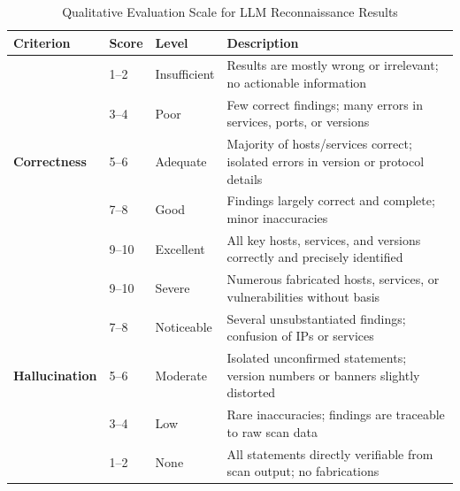 \begin{table}[h]
    \centering
    \caption{Qualitative Evaluation Scale for LLM Reconnaissance Results}
    \label{tab:qualitative-scale}
    \begin{tabularx}{\textwidth}{@{}lllX@{}}
        \toprule
        \textbf{Criterion} & \textbf{Score} & \textbf{Level} & \textbf{Description} \\
        \midrule
        \multirow{5}{*}{\textbf{Correctness}}
        & 1--2  & Insufficient  & Results are mostly wrong or irrelevant; no actionable information \\
        & 3--4  & Poor          & Few correct findings; many errors in services, ports, or versions \\
        & 5--6  & Adequate      & Majority of hosts/services correct; isolated errors in version or protocol details \\
        & 7--8  & Good          & Findings largely correct and complete; minor inaccuracies \\
        & 9--10 & Excellent     & All key hosts, services, and versions correctly and precisely identified \\
        \midrule
        \multirow{5}{*}{\textbf{Hallucination}}
        & 9--10  & Severe        & Numerous fabricated hosts, services, or vulnerabilities without basis \\
        & 7--8  & Noticeable    & Several unsubstantiated findings; confusion of IPs or services \\
        & 5--6  & Moderate      & Isolated unconfirmed statements; version numbers or banners slightly distorted \\
        & 3--4  & Low           & Rare inaccuracies; findings are traceable to raw scan data \\
        & 1--2 & None          & All statements directly verifiable from scan output; no fabrications \\
        \bottomrule
    \end{tabularx}
\end{table}
